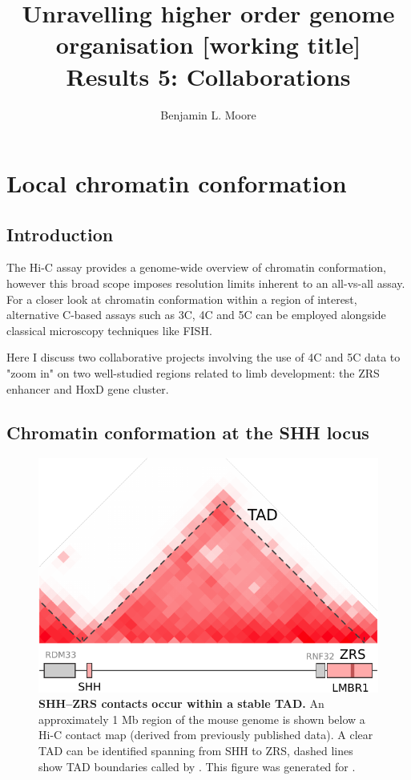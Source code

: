 \documentclass[a4paper,10pt,oneside]{book}
\title{ \vspace{3in} Unravelling higher order genome organisation {\small [working
    title]} \\ \vspace{2em} {\large {\bf Results 5: Collaborations}} }
\author{Benjamin L. Moore}
\begin{document}

\chapter{Local chromatin conformation}

\section{Introduction}

The Hi-C assay provides a genome-wide overview of chromatin conformation, however this broad scope imposes resolution limits inherent to an all-vs-all assay. For a closer look at chromatin conformation within a region of interest, alternative C-based assays such as 3C, 4C and 5C can be employed alongside classical microscopy techniques like FISH.

Here I discuss two collaborative projects involving the use of 4C and 5C data to "zoom in" on two well-studied regions related to limb development: the ZRS enhancer and HoxD gene cluster.

\section{Chromatin conformation at the SHH locus}

\begin{figure}
\begin{center} 
\includegraphics[width=.7\textwidth]{figs/shhtad.pdf}
\captionsetup{width=\textwidth} 
\caption[SHH--ZRS contacts occur within a stable TAD.]{ {\bf SHH--ZRS contacts occur within a stable TAD. }
An approximately 1 Mb region of the mouse genome is shown below a Hi-C contact map (derived from previously published data\cite{Dixon2012}). A clear TAD can be identified spanning from SHH to ZRS, dashed lines show TAD boundaries called by \citet{Dixon2012}. This figure was generated for \citet{Anderson2014a}.
}\label{fig:shhtad}
\end{center} 
\end{figure} 
\end{document}

